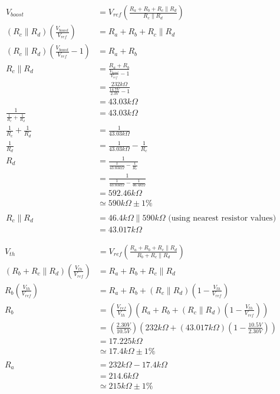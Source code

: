 \documentclass[11pt]{article} %
\begin{document}
\begin{align*}
V_{boost} &= V_{ref}\left(\frac{R_a + R_b + R_c \parallel R_d}{R_c \parallel R_d}\right) \\
\left(R_c \parallel R_d\right)\left(\frac{V_{boost}}{V_{ref}}\right) &= R_a + R_b + R_c \parallel R_d \\
\left(R_c \parallel R_d\right)\left(\frac{V_{boost}}{V_{ref}} - 1\right) &= R_a + R_b \\
R_c \parallel R_d &= \frac{R_a + R_b}{\frac{V_{boost}}{V_{ref}} - 1} \\
&= \frac{232k\Omega}{\frac{14.7V}{2.3V} - 1} \\
&= 43.03k\Omega \\
\frac{1}{\frac{1}{R_c} + \frac{1}{R_d}} &= 43.03k\Omega \\
\frac{1}{R_c} + \frac{1}{R_d} &= \frac{1}{43.03k\Omega} \\
\frac{1}{R_d} &= \frac{1}{43.03k\Omega} - \frac{1}{R_c} \\
R_d &= \frac{1}{\frac{1}{43.03k\Omega} - \frac{1}{R_c}} \\
&= \frac{1}{\frac{1}{43.03k\Omega} - \frac{1}{46.4k\Omega}} \\
&= 592.46k\Omega \\
&\simeq 590k\Omega \pm 1\% \tag{3} \\
\\
R_c \parallel R_d &= 46.4k\Omega \parallel 590k\Omega \text{ (using nearest resistor values)} \\
&= 43.017k\Omega \tag{4}
\end{align*}

\begin{align*}
V_{th} &= V_{ref} \left(\frac{R_a + R_b +  R_c \parallel R_d}{R_b + R_c \parallel R_d}\right) \\
\left(R_b + R_c \parallel R_d\right) \left(\frac{V_{th}}{V_{ref}}\right) &= R_a + R_b + R_c \parallel R_d \\
R_b \left(\frac{V_{th}}{V_{ref}}\right) &= R_a + R_b + \left(R_c \parallel R_d\right) \left(1 - \frac{V_{th}}{V_{ref}}\right) \\
R_b &= \left(\frac{V_{ref}}{V_{th}}\right) \left(R_a + R_b + \left(R_c \parallel R_d\right) \left(1 - \frac{V_{th}}{V_{ref}}\right)\right) \\
&= \left(\frac{2.30V}{10.5V}\right) \left(232k\Omega + \left(43.017k\Omega\right) \left(1 - \frac{10.5V}{2.30V}\right)\right) \\
&= 17.225k\Omega \\
&\simeq 17.4k\Omega \pm 1\% \tag{5} \\
\\
R_a &= 232k\Omega - 17.4k\Omega \\
&= 214.6k\Omega \\
&\simeq 215k\Omega \pm 1\% \tag{6}
\end{align*}
\end{document}
